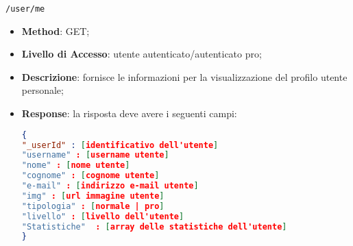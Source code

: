	\item \texttt{/user/me}
		\begin{itemize}
			\item \textbf{Method}: GET;
			\item \textbf{Livello di Accesso}: utente autenticato/autenticato pro;
			\item \textbf{Descrizione}: fornisce le informazioni per la visualizzazione del profilo utente personale;
			\item \textbf{Response}: la risposta deve avere i seguenti campi:
\begin{lstlisting}[language=json,firstnumber=1]
{
"_userId" : [identificativo dell'utente]
"username" : [username utente]
"nome" : [nome utente]
"cognome" : [cognome utente]
"e-mail" : [indirizzo e-mail utente]
"img" : [url immagine utente]
"tipologia" : [normale | pro]
"livello" : [livello dell'utente]
"Statistiche"  : [array delle statistiche dell'utente]
}
\end{lstlisting}
		\end{itemize}